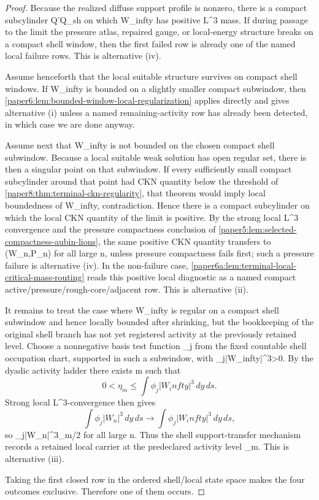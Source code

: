 \documentclass[11pt]{amsart}
\def\({}%
\def\){}%
\def\infty{infty}%
\theoremstyle{plain}
\theoremstyle{definition}
\theoremstyle{remark}
\begin{document}
\begin{proof}
Because the realized diffuse support profile is nonzero, there is a compact
subcylinder \(Q'\Subset Q_{\rm sh}\) on which \(W_\infty\) has positive \(L^3\)
mass.  If during passage to the limit the pressure atlas, repaired gauge, or
local-energy structure breaks on a compact shell window, then the first failed
row is already one of the named local failure rows.  This is
alternative \textup{(iv)}.

Assume henceforth that the local suitable structure survives on compact shell
windows.  If \(W_\infty\) is bounded on a slightly smaller compact subwindow,
then
\cref{paper6:lem:bounded-window-local-regularization} applies directly and gives
alternative \textup{(i)} unless a named remaining-activity row has already been
detected, in which case we are done anyway.

Assume next that \(W_\infty\) is not bounded on the chosen compact shell
subwindow.  Because a local suitable weak solution has open regular set, there is
then a singular point on that subwindow.  If every sufficiently small compact
subcylinder around that point had CKN quantity below the threshold of
\cref{paper8:thm:terminal-ckn-regularity}, that theorem would imply local
boundedness of \(W_\infty\), contradiction.  Hence there is a compact
subcylinder on which the local CKN quantity of the limit is positive.  By the
strong local \(L^3\) convergence and the pressure compactness conclusion of
\cref{paper5:lem:selected-compactness-aubin-lions}, the same positive CKN
quantity transfers to \((W_n,\widetilde P_n)\) for all large \(n\), unless
pressure compactness fails first; such a pressure failure is
alternative \textup{(iv)}.  In the non-failure case,
\cref{paper6a:lem:terminal-local-critical-mass-routing} reads this positive local
diagnostic as a named compact active/pressure/rough-core/adjacent row.  This is
alternative \textup{(ii)}.

It remains to treat the case where \(W_\infty\) is regular on a compact shell
subwindow and hence locally bounded after shrinking, but the bookkeeping of the
original shell branch has not yet registered activity at the previously retained
level.  Choose a nonnegative basis test function \(\phi_j\) from the fixed
countable shell occupation chart, supported in such a subwindow, with
\(\int \phi_j|W_\infty|^3>0\).  By the dyadic activity ladder there exists
\(m\) such that
\[
0<\eta_m\le \int \phi_j|W_\infty|^3\,dy\,ds.
\]
Strong local \(L^3\)-convergence then gives
\[
\int \phi_j|W_n|^3\,dy\,ds\to \int \phi_j|W_\infty|^3\,dy\,ds,
\]
so \(\int \phi_j|W_n|^3\ge \eta_m/2\) for all large \(n\).  Thus the shell
support-transfer mechanism records a retained local carrier at the predeclared
activity level \(\eta_m\).  This is alternative \textup{(iii)}.

Taking the first closed row in the ordered shell/local state space makes the
four outcomes exclusive.  Therefore one of them occurs.
\end{proof}
\end{document}
